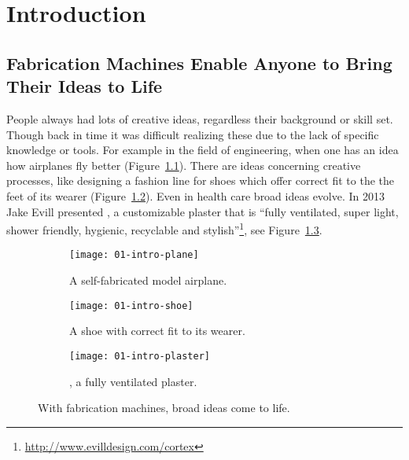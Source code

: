 \documentclass[../ClassicThesis.tex]{subfiles}
\begin{document}
\chapter{Introduction}
\label{ch:introduction}

\section{Fabrication Machines Enable Anyone to Bring Their Ideas to Life}
\label{sec:introduction}



People always had lots of creative ideas, regardless their
background or skill set. Though back in time it was
difficult realizing these due to the lack of specific
knowledge or tools. For example in the field of engineering,
when one has an idea how airplanes fly better
(Figure~\ref{fig:intro-ideas:plane}). There are ideas
concerning creative processes, like designing a fashion line
for shoes which offer correct fit to the the feet of its
wearer (Figure~\ref{fig:intro-ideas:shoe}). Even in health
care broad ideas evolve. In 2013 Jake Evill presented
, a customizable plaster that is \enquote{fully
  ventilated, super light, shower friendly, hygienic,
  recyclable and
  stylish}\footnote{\url{http://www.evilldesign.com/cortex}},
see Figure~\ref{fig:intro-ideas:plaster}.

\begin{figure}[ht]
  \centering
  \begin{subfigure}[b]{\textwidth}
    \texttt{[image: 01-intro-plane]}
    \caption{A self-fabricated model airplane.}
    \label{fig:intro-ideas:plane}
  \end{subfigure}
  \begin{subfigure}[b]{\textwidth}
    \texttt{[image: 01-intro-shoe]}
    \caption{A shoe with correct fit to its wearer.}
    \label{fig:intro-ideas:shoe}
  \end{subfigure}
  \begin{subfigure}[c]{\textwidth}
    \texttt{[image: 01-intro-plaster]}
    \caption{, a fully ventilated plaster.}
    \label{fig:intro-ideas:plaster}
  \end{subfigure}
  \caption{With fabrication machines, broad ideas come to life.}
  \label{fig:intro-ideas}
\end{figure}
\end{document}
